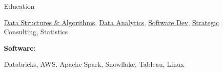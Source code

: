 \documentclass{resume/resume}
\begin{document}
\begin{rSection}{Education}
\begin{adjustwidth}{6em}{0pt}
    \href{https://www.youtube.com/watch?v=lMFQp3wN-cg}{Data Structures \& Algorithms},
    \href{https://github.com/UtahTriangle/Laws/blob/main/Proposals/NationalsHelp/figures/distances.pdf}{Data Analytics}, %
    \href{https://github.com/spelkington}{Software Dev},
    \href{https://spelkington.github.io/assets/utah_office_update.pdf}{Strategic Consulting}, %
    Statistics
    
\end{adjustwidth}


%
%
%
\vspace{-3pt}
{\bf Software:}
\vspace{-1.83em}
\begin{adjustwidth}{6em}{0pt}
    Databricks,
    AWS,
    Apache Spark,
    Snowflake,
    Tableau,
    Linux

\end{adjustwidth}

\end{rSection}
\end{document}
